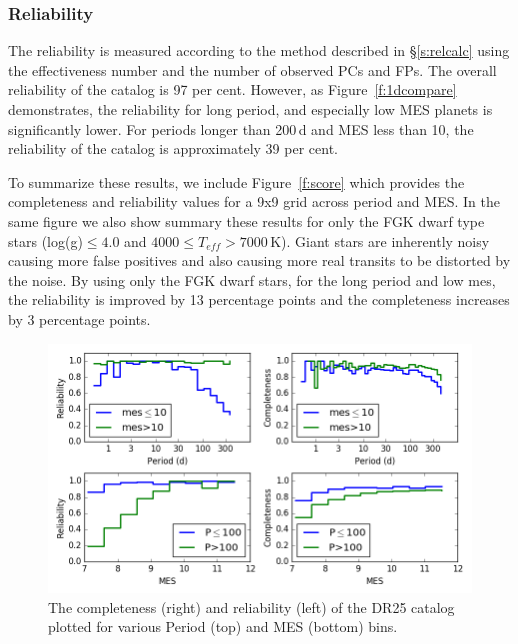 \subsubsection{Reliability}
The reliability is measured according to the method described in \S\ref{s:relcalc} using the effectiveness number and the number of observed PCs and FPs.  The overall reliability of the catalog is 97 per cent. However, as Figure~\ref{f:1dcompare} demonstrates, the reliability for long period, and especially low MES planets is significantly lower.  For periods longer than 200\,d and MES less than 10, the reliability of the catalog is approximately 39 per cent.

To summarize these results, we include Figure~\ref{f:score} which provides the completeness and reliability values for a 9x9 grid across period and MES. In the same figure we also show summary these results for only the FGK dwarf type stars (log(g)$\leq4.0$ and $4000 \leq T_{eff} > 7000$\,K). Giant stars are inherently noisy causing more false positives and also causing more real transits to be distorted by the noise.  By using only the FGK dwarf stars, for the long period and low mes, the reliability is improved by 13 percentage points  and the completeness increases by 3 percentage points.


\begin{figure}[h!]
 \begin{center}
  \includegraphics[width=1.0\linewidth]{fig-compRel1D-PerMes.png}
  \caption{\label{f:1dcomparel} The completeness (right) and reliability (left) of the DR25 catalog plotted for various Period (top) and MES (bottom) bins.}
 \end{center}
 \end{figure}


